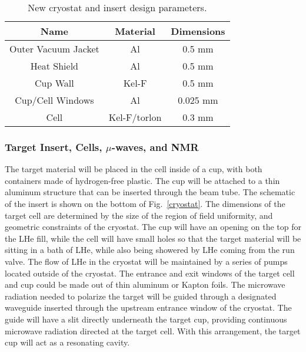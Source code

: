 \begin{table}[hbt]
\begin{center}
\begin{tabular}{|c|c|c|} \hline
Name   & Material  & Dimensions  \\
\hline 
Outer Vacuum Jacket & Al & 0.5 mm \\
\hline
Heat Shield & Al & 0.5 mm \\
\hline
Cup Wall & Kel-F & 0.5 mm\\
\hline
Cup/Cell Windows & Al& 0.025 mm \\
\hline
Cell & Kel-F/torlon & 0.3 mm\\
\hline
\end{tabular}
\end{center}
\caption{\small{New cryostat and insert design parameters.}}
\label{fridge}
\end{table} 
 
\subsubsection{Target Insert, Cells, $\mu$-waves, and NMR}

The target material will be placed in the cell inside of a cup, with both 
containers made of hydrogen-free plastic. The cup will be attached to a thin 
aluminum structure that can be inserted through the beam tube. The schematic 
of the insert is shown on the bottom of Fig.~\ref{cryostat}.  The dimensions 
of the target cell are determined by the size of the region of field 
uniformity, and geometric constraints of the cryostat. The cup will have an 
opening on the top for the LHe fill, while the cell will have small holes so 
that the target material will be sitting in a bath of LHe, while also being 
showered by LHe coming from the run valve. The flow of LHe in the cryostat 
will be maintained by a series of pumps located outside of the cryostat. The 
entrance and exit windows of the target cell and cup could be made out of 
thin aluminum or Kapton foils. The microwave radiation needed to polarize 
the target will be guided through a designated waveguide inserted through the 
upstream entrance window of the cryostat.  The guide will have a slit directly 
underneath the target cup, providing continuous microwave radiation directed 
at the target cell.  With this arrangement, the target cup will act as a 
resonating cavity.     

